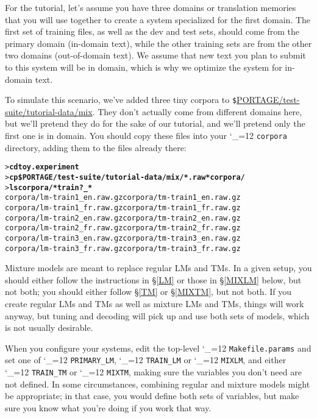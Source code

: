 \documentclass[11pt,letterpaper]{article}
\def\code{\begingroup\catcode`\_=12 \codex}
\newcommand{\codex}[1]{\texttt{#1}\endgroup}
\begin{document}
For the tutorial, let's assume
you have three domains or translation memories that you will use
together to create a system specialized for the first domain.  The first set of
training files, as well as the dev and test sets, should come from the primary
domain (in-domain text), while the other training sets are from the other two
domains (out-of-domain text).  We assume that new text you plan to submit to
this system will be in domain, which is why we optimize the system for
in-domain text.

To simulate this scenario, we've added three tiny corpora to
\verb"$"\url{PORTAGE/test-suite/tutorial-data/mix}.
They don't actually come from different domains here, but we'll pretend they do
for the sake of our tutorial, and we'll pretend only the first one is in
domain.  You should copy these files into your \code{corpora} directory, adding
them to the files already there:
\begin{small}
\begin{alltt}
   > \textbf{cd toy.experiment}
   > \textbf{cp \$PORTAGE/test-suite/tutorial-data/mix/*.raw* corpora/}
   > \textbf{ls corpora/*train?_*}
   corpora/lm-train1_en.raw.gz  corpora/tm-train1_en.raw.gz
   corpora/lm-train1_fr.raw.gz  corpora/tm-train1_fr.raw.gz
   corpora/lm-train2_en.raw.gz  corpora/tm-train2_en.raw.gz
   corpora/lm-train2_fr.raw.gz  corpora/tm-train2_fr.raw.gz
   corpora/lm-train3_en.raw.gz  corpora/tm-train3_en.raw.gz
   corpora/lm-train3_fr.raw.gz  corpora/tm-train3_fr.raw.gz
\end{alltt}
\end{small}

Mixture models are meant to replace regular LMs and TMs. In a given setup, you
should either follow the instructions in \S\ref{LM} or those in \S\ref{MIXLM}
below, but not both; you should either follow \S\ref{TM} or \S\ref{MIXTM}, but
not both.  If you create regular LMs and
TMs as well as mixture LMs and TMs, things will work anyway, but tuning and
decoding will pick up and use both sets of models, which is not usually
desirable.

When you configure your systems, edit the top-level \code{Makefile.params} and
set one of \code{PRIMARY_LM}, \code{TRAIN_LM} or \code{MIXLM}, and either \code{TRAIN_TM} or
\code{MIXTM}, making sure the variables you don't need are not defined. In some
circumstances, combining regular and mixture models might be appropriate; in
that case, you would define both sets of variables, but make sure you know what
you're doing if you work that way.
\end{document}
